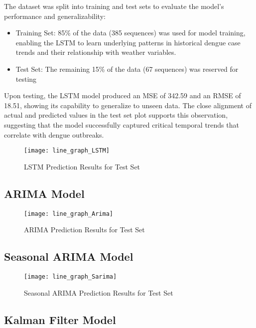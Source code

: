 The dataset was split into training and test sets to evaluate the model’s performance and generalizability:
\begin{itemize}
	\item Training Set: 85\% of the data (385 sequences) was used for model training, enabling the LSTM to learn underlying patterns in historical dengue case trends and their relationship with weather variables.
	\item Test Set: The remaining 15\% of the data (67 sequences) was reserved for testing
\end{itemize}

Upon testing, the LSTM model produced an MSE of 342.59 and an RMSE of 18.51, showing its capability to generalize to unseen data. The close alignment of actual and predicted values in the test set plot supports this observation, suggesting that the model successfully captured critical temporal trends that correlate with dengue outbreaks.

\begin{figure}[H]
	\centering
	\texttt{[image: line\_graph\_LSTM]}
	\caption{LSTM Prediction Results for Test Set}
	\label{fig:LSTM_result}
\end{figure}

\subsection{ARIMA Model}

\begin{figure}[H]
	\centering
	\texttt{[image: line\_graph\_Arima]}
	\caption{ARIMA Prediction Results for Test Set}
	\label{fig:Arima_result}
\end{figure}

\subsection{Seasonal ARIMA Model}

\begin{figure}[H]
	\centering
	\texttt{[image: line\_graph\_Sarima]}
	\caption{Seasonal ARIMA Prediction Results for Test Set}
	\label{fig:Sarima_result}
\end{figure}

\subsection{Kalman Filter Model}

